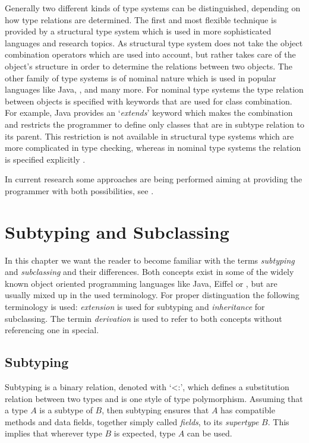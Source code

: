 Generally two different kinds of type systems can be distinguished,
depending on how type relations are determined. The first and most
flexible technique is provided by a structural type system which is
used in more sophisticated languages and research topics. As structural
type system does not take the object combination operators which are
used into account, but rather takes care of the object's structure in
order to determine the relations between two objects. The other family
of type systems is of nominal nature which is used in popular languages
like Java, \cs, \cpp and many more. For nominal type systems the type
relation between objects is specified with keywords that are used for
class combination. For example, Java provides an `\emph{extends}' keyword
which makes the combination and restricts the programmer to define only
classes that are in subtype relation to its parent. This restriction is
not available in structural type systems which are more complicated in
type checking, whereas in nominal type systems the relation is specified
explicitly \cite{malayeri_integrating_2008,pierce_types_2002}.

In current research some approaches are being performed aiming
at providing the programmer with both possibilities, see
\cite{findler_semantic_2004,gil_whiteoak:_2008,malayeri_integrating_2008}.

\section{Subtyping and Subclassing}
\label{chap:subtypingVsSubclassing}
In this chapter we want the reader to become familiar with the terms
\emph{subtyping} and \emph{subclassing} and their differences. Both
concepts exist in some of the widely known object oriented programming
languages like Java, Eiffel or \cpp, but are usually mixed up in the
used terminology. For proper distinguation the following terminology is
used: \emph{extension} is used for subtyping and \emph{inheritance} for
subclassing. The termin \emph{derivation} is used to refer to both concepts without referencing one in
special.

\subsection{Subtyping}
 Subtyping is a binary relation, denoted with
`<:', which defines a substitution relation between two types and is one
style of type polymorphism. Assuming that a type $A$ is a subtype of $B$,
then subtyping ensures that $A$ has compatible methods and data fields,
together simply called \emph{fields}, to its \emph{supertype} $B$. This
implies that wherever type $B$ is expected, type $A$ can be used.

